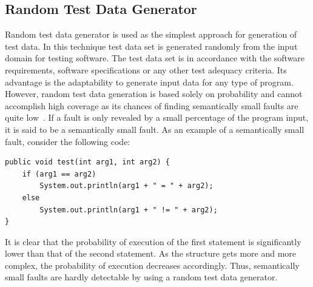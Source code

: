 

\subsection{Random Test Data Generator}
\label{sec:randomgenerator_2}
Random test data generator is used as the simplest approach for generation of test data. In this technique test data set is generated randomly from the input domain for testing software. The test data set is in accordance with the software requirements, software specifications or any other test adequacy criteria. Its advantage is the adaptability to generate input data for any type of program. However, random test data generation is based solely on probability and cannot accomplish high coverage as its chances of finding semantically small faults are quite low~\cite{godefroid2005dart}. If a fault is only revealed by a small percentage of the program input, it is said to be a semantically small fault. As an example of a semantically small fault, consider the following code:
\bigskip
\begin{lstlisting}
public void test(int arg1, int arg2) {
    if (arg1 == arg2)
        System.out.println(arg1 + " = " + arg2);
    else 
        System.out.println(arg1 + " != " + arg2);
}
\end{lstlisting}
It is clear that the probability of execution of the first statement is significantly lower than that of the second statement. As the structure gets more and more complex, the probability of execution decreases accordingly. Thus, semantically small faults are hardly detectable by using a random test data generator. 

